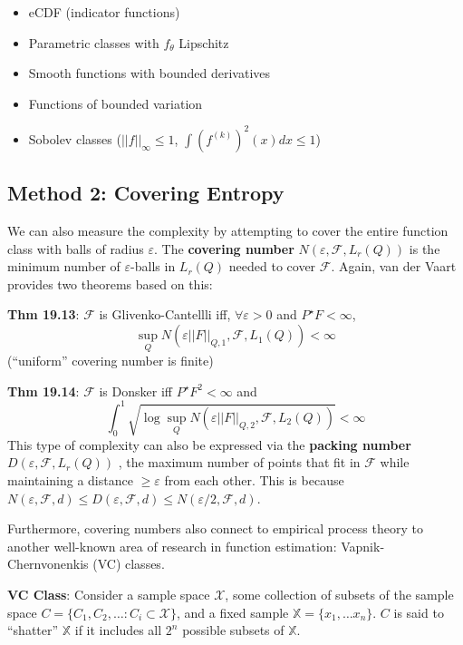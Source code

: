 \documentclass[
]{article}
\begin{document}
\begin{itemize}
	\item eCDF (indicator functions)
	\item Parametric classes with \(f_\theta\) Lipschitz
	\item Smooth functions with bounded derivatives
	\item Functions of bounded variation
	\item Sobolev classes (\(||f||_\infty \leq 1\),
	\(\int (f^{(k)})^2(x)dx \leq 1\))
\end{itemize}

\subsection{Method 2: Covering
Entropy}\label{method-2-covering-entropy}

We can also measure the complexity by attempting to cover the entire
function class with balls of radius \(\varepsilon\). The
\textbf{covering number} \(N(\varepsilon, \mathcal{F}, L_r(Q))\) is the
minimum number of \(\varepsilon\)-balls in \(L_r(Q)\) needed to cover
\(\mathcal{F}\). Again, van der Vaart provides two theorems based on
this:

\textbf{Thm 19.13}: \(\mathcal{F}\) is Glivenko-Cantellli iff,
\(\forall \varepsilon > 0\) and \(P^\star F < \infty\),
\[\sup_{Q}N(\varepsilon||F||_{Q,1}, \mathcal{F}, L_1(Q)) < \infty\]
(``uniform'' covering number is finite)

\textbf{Thm 19.14}: \(\mathcal{F}\) is Donsker iff
\(P^\star F^2 < \infty\) and
\[\int_{0}^{1}\sqrt{\log\sup_{Q}N(\varepsilon||F||_{Q,2}, \mathcal{F}, L_2(Q))} < \infty\]
This type of complexity can also be expressed via the \textbf{packing
number} \(D(\varepsilon, \mathcal{F}, L_r(Q))\) , the maximum number of
points that fit in \(\mathcal{F}\) while maintaining a distance
\(\geq \varepsilon\) from each other. This is because
\(N(\varepsilon, \mathcal{F}, d) \leq D(\varepsilon, \mathcal{F}, d) \leq N(\varepsilon/2, \mathcal{F}, d)\).

Furthermore, covering numbers also connect to empirical process theory
to another well-known area of research in function estimation:
Vapnik-Chernvonenkis (VC) classes.

\textbf{VC Class}: Consider a sample space \(\mathcal{X}\), some
collection of subsets of the sample space
\(C = \{C_1, C_2, \ldots : C_i \subset \mathcal{X}\}\), and a fixed
sample \(\mathbb{X} = \{x_1, \ldots x_n\}\). \(C\) is said to
``shatter'' \(\mathbb{X}\) if it includes all \(2^n\) possible subsets
of \(\mathbb{X}\).
\end{document}
